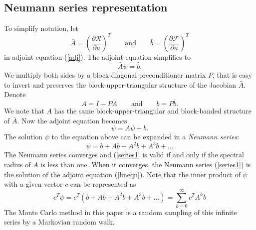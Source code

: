 \documentclass[a4paper,11pt]{article}
\theoremstyle{remark}
\theoremstyle{definition}
\begin{document}
    \subsection{Neumann series representation}
        To simplify notation, let
        \[ \bar{A} = \left( \frac{\partial \mathcal{R}}{\partial u} \right)^T
            \qquad \mbox{and} \qquad
            \bar{b} = \left( \frac{\partial \mathcal{F}}{\partial u} \right)^T
        \]
        in adjoint equation (\ref{adj}).  The adjoint equation simplifies to
        \[ \bar{A} \psi = \bar{b} . \] We multiply both sides by a
        block-diagonal preconditioner matrix $P$, that is easy to invert
        and preserves the block-upper-triangular structure of the Jacobian
        $\bar{A}$. Denote
        \begin{equation}
            A = I - P \bar{A} \qquad \mbox{and} \qquad b = P \bar{b} .
            \label{precond}
        \end{equation}
        We note that $A$ has the same block-upper-triangular and block-banded
        structure of $\bar{A}$.  Now the adjoint equation becomes
        \begin{equation}
            \psi = A \psi + b .
            \label{lineqn}
        \end{equation}
        The solution $\psi$ to the equation above can be expanded in a
        \emph{Neumann series}:
        \begin{equation}
            \psi = b + A b + A^2 b + A^3 b + \ldots
            \label{series1}
        \end{equation}
        The Neumann series converges and (\ref{series1} is valid if and only
        if the spectral radius of $A$ is less than one. When it converges,
        the Neumann series (\ref{series1}) is the solution of the adjoint
        equation (\ref{lineqn}). Note that the inner product of $\psi$
        with a given vector $c$ can be represented as
        \begin{equation}
            c^T \psi = c^T ( b + A b + A^2 b + A^3 b + \ldots )
                     = \sum_{k=0}^\infty c^T A^k b
            \label{series}
        \end{equation}
        The Monte Carlo method in this paper is a random sampling of this
        infinite series by a Markovian random walk.
    
\end{document}
